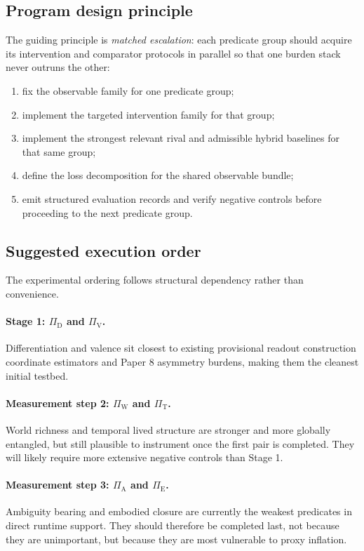 \documentclass[11pt,a4paper]{article}
\theoremstyle{definition}
\newcommand{\PiD}{\Pi_{\mathrm{D}}}
\newcommand{\PiV}{\Pi_{\mathrm{V}}}
\newcommand{\PiW}{\Pi_{\mathrm{W}}}
\newcommand{\PiA}{\Pi_{\mathrm{A}}}
\newcommand{\PiE}{\Pi_{\mathrm{E}}}
\newcommand{\PiT}{\Pi_{\mathrm{T}}}
\begin{document}
\subsection{Program design principle}
The guiding principle is \emph{matched escalation}: each predicate group should acquire its intervention and comparator protocols in parallel so that one burden stack never outruns the other:
\begin{enumerate}[leftmargin=1.5em]
\item fix the observable family for one predicate group;
\item implement the targeted intervention family for that group;
\item implement the strongest relevant rival and admissible hybrid baselines for that same group;
\item define the loss decomposition for the shared observable bundle;
\item emit structured evaluation records and verify negative controls before proceeding to the next predicate group.
\end{enumerate}

\subsection{Suggested execution order}
The experimental ordering follows structural dependency rather than convenience.

\paragraph{Stage 1: $\PiD$ and $\PiV$.}
Differentiation and valence sit closest to existing provisional readout construction coordinate estimators and Paper 8 asymmetry burdens, making them the cleanest initial testbed.

\paragraph{Measurement step 2: $\PiW$ and $\PiT$.}
World richness and temporal lived structure are stronger and more globally entangled, but still plausible to instrument once the first pair is completed. They will likely require more extensive negative controls than Stage 1.

\paragraph{Measurement step 3: $\PiA$ and $\PiE$.}
Ambiguity bearing and embodied closure are currently the weakest predicates in direct runtime support. They should therefore be completed last, not because they are unimportant, but because they are most vulnerable to proxy inflation.
\end{document}
